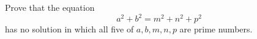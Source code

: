 Prove that the equation
\[a^2+b^2=m^2+n^2+p^2\]
has no solution in which all five of $a,b,m,n,p$ are prime numbers.
